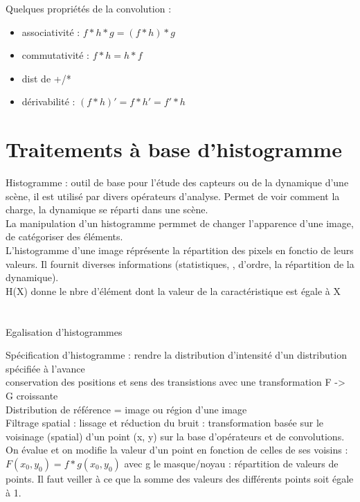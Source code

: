 \documentclass[11pt]{article}
\begin{document}
Quelques propriétés de la convolution :
\begin{itemize}
	\item associativité : $f * h * g =(f*h) *g$
	\item commutativité : $f* h = h * f$
	\item dist de +/*
	\item dérivabilité : $(f *h)' = f * h' = f' * h$
\end{itemize}

\newpage

\section{Traitements à base d'histogramme}

Histogramme : outil de base pour l'étude des capteurs ou de la dynamique d'une scène, il est utilisé par divers opérateurs d'analyse. Permet de voir comment la charge, la dynamique se réparti dans une scène.\\

La manipulation d'un histogramme permmet de changer l'apparence d'une image, de catégoriser des éléments.\\

L'histogramme d'une image réprésente la répartition des pixels en fonctio de leurs valeurs. Il fournit diverses informations (statistiques, , d'ordre, la répartition de la dynamique).\\

H(X) donne le nbre d'élément dont la valeur de la caractéristique est égale à X

\vskip 2cm

\section{}

Egalisation d'histogrammes 

\vskip 1cm

Spécification d'histogramme : rendre la distribution d'intensité d'un distribution spécifiée à l'avance\\
conservation des positions et sens des transistions avec une transformation F -> G croissante\\
Distribution de référence = image ou région d'une image\\

Filtrage spatial : lissage et réduction du bruit : transformation basée sur le voisinage (spatial) d'un point (x, y) sur la base d'opérateurs et de convolutions.\\
On évalue et on modifie la valeur d'un point en fonction de celles de ses voisins : $F(x_0, y_0) = f * g(x_0, y_0)$ avec g le masque/noyau : répartition de valeurs de points. Il faut veiller à ce que la somme des valeurs des différents points soit égale à 1.\\
\end{document}
